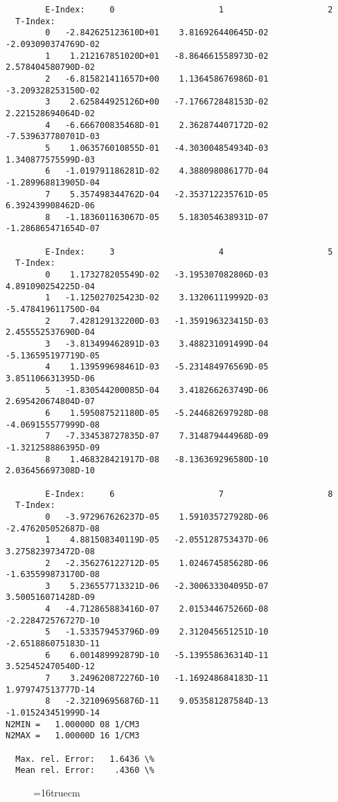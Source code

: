 \documentclass[12pt,dvipdfmx]{article}
\begin{document}
{\begin{small}\begin{verbatim}
        E-Index:     0                     1                     2
  T-Index:
        0   -2.842625123610D+01    3.816926440645D-02   -2.093090374769D-02
        1    1.212167851020D+01   -8.864661558973D-02    2.578404580790D-02
        2   -6.815821411657D+00    1.136458676986D-01   -3.209328253150D-02
        3    2.625844925126D+00   -7.176672848153D-02    2.221528694064D-02
        4   -6.666700835468D-01    2.362874407172D-02   -7.539637780701D-03
        5    1.063576010855D-01   -4.303004854934D-03    1.340877575599D-03
        6   -1.019791186281D-02    4.388098086177D-04   -1.289968813905D-04
        7    5.357498344762D-04   -2.353712235761D-05    6.392439908462D-06
        8   -1.183601163067D-05    5.183054638931D-07   -1.286865471654D-07

        E-Index:     3                     4                     5
  T-Index:
        0    1.173278205549D-02   -3.195307082806D-03    4.891090254225D-04
        1   -1.125027025423D-02    3.132061119992D-03   -5.478419611750D-04
        2    7.428129132200D-03   -1.359196323415D-03    2.455552537690D-04
        3   -3.813499462891D-03    3.488231091499D-04   -5.136595197719D-05
        4    1.139599698461D-03   -5.231484976569D-05    3.851106631395D-06
        5   -1.830544200085D-04    3.418266263749D-06    2.695420674804D-07
        6    1.595087521180D-05   -5.244682697928D-08   -4.069155577999D-08
        7   -7.334538727835D-07    7.314879444968D-09   -1.321258886395D-09
        8    1.468328421917D-08   -8.136369296580D-10    2.036456697308D-10

        E-Index:     6                     7                     8
  T-Index:
        0   -3.972967626237D-05    1.591035727928D-06   -2.476205052687D-08
        1    4.881508340119D-05   -2.055128753437D-06    3.275823973472D-08
        2   -2.356276122712D-05    1.024674585628D-06   -1.635599873170D-08
        3    5.236557713321D-06   -2.300633304095D-07    3.500516071428D-09
        4   -4.712865883416D-07    2.015344675266D-08   -2.228472576727D-10
        5   -1.533579453796D-09    2.312045651251D-10   -2.651886075183D-11
        6    6.001489992879D-10   -5.139558636314D-11    3.525452470540D-12
        7    3.249620872276D-10   -1.169248684183D-11    1.979747513777D-14
        8   -2.321096956876D-11    9.053581287584D-13   -1.015243451999D-14
N2MIN =   1.00000D 08 1/CM3
N2MAX =   1.00000D 16 1/CM3

  Max. rel. Error:   1.6436 \%
  Mean rel. Error:    .4360 \%
\end{verbatim}\end{small}
\begin{figure} \label{2.1.5o}
\epsfxsize=16truecm
\end{figure}
\newpage


}
\end{document}
